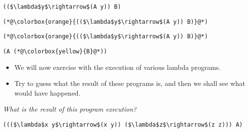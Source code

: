 \documentclass{beamer}
\begin{document}
\begin{frame}[fragile]{\CurrentSection}
\lstset{basicstyle=\ttfamily\small}\lstset{numbers=none}\lstset{language=ML}\begin{lstlisting}
(($\lambda$y$\rightarrow$(A y)) B)
\end{lstlisting}
\pause\lstset{language=ML}\begin{lstlisting}
(*@\colorbox{orange}{(($\lambda$y$\rightarrow$(A y)) B)}@*)
\end{lstlisting}

\end{frame}

\begin{frame}[fragile]{\CurrentSection}
\lstset{basicstyle=\ttfamily\small}\lstset{numbers=none}\lstset{language=ML}\begin{lstlisting}
(*@\colorbox{orange}{(($\lambda$y$\rightarrow$(A y)) B)}@*)
\end{lstlisting}
\pause\lstset{language=ML}\begin{lstlisting}
(A (*@\colorbox{yellow}{B}@*))
\end{lstlisting}

\end{frame}

\begin{frame}[fragile]{\CurrentSection}
\begin{block}{\CurrentSubSection}
\begin{itemize}
\item We will now exercise with the execution of various lambda programs.
\item Try to guess what the result of these programs is, and then we shall see what would have happened.

\end{itemize}

\end{block}


\end{frame}

\begin{frame}[fragile]{\CurrentSection}
\begin{exampleblock}{}
\textit{What is the result of this program execution?}
\end{exampleblock}

 
\lstset{basicstyle=\ttfamily\small}\lstset{numbers=none}\lstset{language=ML}\begin{lstlisting}
((($\lambda$x y$\rightarrow$(x y)) ($\lambda$z$\rightarrow$(z z))) A)
\end{lstlisting}
 

\end{frame}
\end{document}
